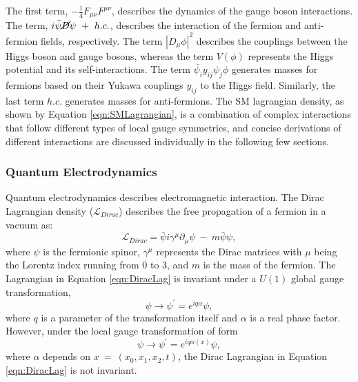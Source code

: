 The first term, $-\frac{1}{4}F_{\mu\nu}F^{\mu\nu}$, describes the dynamics of the gauge boson interactions. The term, $i\bar{\psi} \cancel{D} \psi ~+~ h.c.$, describes the interaction of the fermion and anti-fermion fields, respectively. The term $|D_{\mu}\phi|^{2}$ describes the couplings between the Higgs boson and gauge bosons, whereas the term $V(\phi)$ represents the Higgs potential and its self-interactions. The term $\bar{\psi_{i}}y_{ij}\psi_{j}\phi$ generates masses for fermions based on their Yukawa couplings $y_{ij}$ to the Higgs field. Similarly, the last term $h.c.$ generates masses for anti-fermions. The SM lagrangian density, as shown by Equation \ref{eqn:SMLagrangian}, is a combination of complex interactions that follow different types of local gauge symmetries, and concise derivations of different interactions are discussed individually in the following few sections.
 
\subsubsection{Quantum Electrodynamics}
\label{subsubsec:QED}
Quantum electrodynamics describes electromagnetic interaction. The Dirac Lagrangian density ($\mathcal{L}_{Dirac}$) describes the free propagation of a fermion in a vacuum as:  
\begin{equation}
\mathcal{L}_{Dirac} = \bar{\psi} i \gamma^{\mu} \partial_{\mu} \psi ~-~ m\bar{\psi}\psi,
\label{eqn:DiracLag}
\end{equation}
where $\psi$ is the fermionic spinor, $\gamma^{\mu}$ represents the Dirac matrices with $\mu$ being the Lorentz index running from $0$ to $3$, and $m$ is the mass of the fermion. 
The Lagrangian in Equation \ref{eqn:DiracLag} is invariant under a $U(1)$ global gauge transformation, 
\begin{equation}
\psi\rightarrow \psi^{'}=e^{iq\alpha}\psi, 
\label{eqn:QEDGlobalTrans}
\end{equation}
where $q$ is a parameter of the transformation itself and $\alpha$ is a real phase factor. However, under the local gauge transformation of form 
\begin{equation}
\psi\rightarrow \psi^{'}=e^{iq\alpha(x)}\psi,
\label{eqn:QEDLocalTrans}
\end{equation}
where $\alpha$ depends on $x~=~(x_{0},x_{1},x_{2},t)$, the Dirac Lagrangian in Equation \ref{eqn:DiracLag} is not invariant. 

